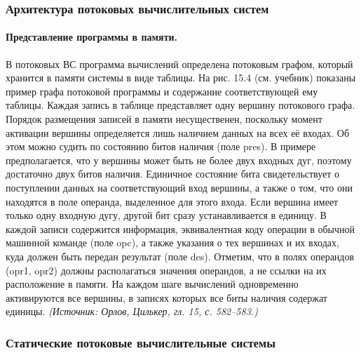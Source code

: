 \documentclass[a4paper,12pt]{article}
\begin{document}
\subsubsection{Архитектура потоковых вычислительных систем}

\paragraph{Представление программы в памяти.}
В потоковых ВС программа вычислений определена потоковым графом, который хранится в памяти системы в виде таблицы. На рис. 15.4 (см. учебник) показаны пример графа потоковой программы и содержание соответствующей ему таблицы. Каждая запись в таблице представляет одну вершину потокового графа. Порядок размещения записей в памяти несущественен, поскольку момент активации вершины определяется лишь наличием данных на всех её входах. Об этом можно судить по состоянию битов наличия (поле pres). В примере предполагается, что у вершины может быть не более двух входных дуг, поэтому достаточно двух битов наличия. Единичное состояние бита свидетельствует о поступлении данных на соответствующий вход вершины, а также о том, что они находятся в поле операнда, выделенное для этого входа. Если вершина имеет только одну входную дугу, другой бит сразу устанавливается в единицу. В каждой записи содержится информация, эквивалентная коду операции в обычной машинной команде (поле opc), а также указания о тех вершинах и их входах, куда должен быть передан результат (поле des). Отметим, что в полях операндов (opr1, opr2) должны располагаться значения операндов, а не ссылки на их расположение в памяти. На каждом шаге вычислений одновременно активируются все вершины, в записях которых все биты наличия содержат единицы.
\textit{(Источник: Орлов, Цилькер, гл. 15, с. 582--583.)}

\subsubsection{Статические потоковые вычислительные системы}
\end{document}
